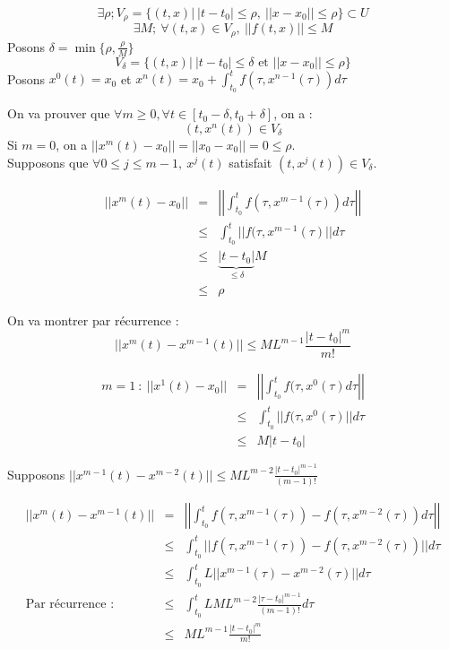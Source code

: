 \begin{dem}
\[\exists \rho; V_{\rho}=\{(t,x)|\ |t-t_0|\leq \rho,\ ||x-x_0||\leq \rho\}\subset U\]
\[\exists M;\ \forall(t,x)\in V_{\rho},\ ||f(t,x)||\leq M\]
Posons $\delta=\min\{\rho,\frac{\rho}{M}\}$
\[V_{\delta}=\{(t,x)|\ |t-t_0|\leq \delta \text{ et } ||x-x_0||\leq \rho\}\]
Posons $x^0(t)=x_0$ et $x^n(t)=x_0+\int_{t_0}^t f(\tau,x^{n-1}(\tau)) d\tau$ 

On va prouver que $\forall m\geq0, \forall t\in[t_0-\delta,t_0+\delta]$, on a : \[(t,x^n(t))\in V_{\delta}\]
Si $m=0$, on a $||x^m(t)-x_0||=||x_0-x_0||=0\leq \rho$.\\
Supposons que $\forall 0\leq j\leq m-1,\ x^j(t)$ satisfait $(t,x^j(t)) \in V_{\delta}$.

\begin{eqnarray*}
||x^m(t)-x_0||&=&\left|\left|\int_{t_0}^t f(\tau,x^{m-1}(\tau)) d\tau\right|\right|\\
&\leq& \int_{t_0}^t ||f(\tau,x^{m-1}(\tau)|| d\tau \\
&\leq& \underbrace{|t-t_0|}_{\leq \delta} M \\
&\leq& \rho
\end{eqnarray*}

On va montrer par récurrence :
\[||x^m(t)-x^{m-1}(t)|| \leq ML^{m-1} \frac{|t-t_0|^m}{m!}\]

\begin{eqnarray*}
m=1\ :\ ||x^1(t)-x_0||&=&\left|\left|\int_{t_0}^t f(\tau,x^0(\tau) d\tau \right|\right| \\
	&\leq& \int_{t_0}^t ||f(\tau,x^0(\tau)|| d\tau \\
	&\leq& M|t-t_0|
\end{eqnarray*}

Supposons $||x^{m-1}(t)-x^{m-2}(t)||\leq ML^{m-2}\frac{|t-t_0|^{m-1}}{(m-1)!}$

\begin{eqnarray*}
||x^m(t)-x^{m-1}(t)|| &=& \left|\left|\int_{t_0}^t f(\tau,x^{m-1}(\tau))-f(\tau,x^{m-2}(\tau)) d\tau \right|\right| \\
&\leq& \int_{t_0}^t ||f(\tau,x^{m-1}(\tau)) - f(\tau,x^{m-2}(\tau))|| d\tau \\
&\leq& \int_{t_0}^t L||x^{m-1}(\tau)-x^{m-2}(\tau)|| d\tau \\
\text{Par récurrence : } &\leq& \int_{t_0}^t LML^{m-2}\frac{|\tau-t_0|^{m-1}}{(m-1)!} d\tau \\
&\leq& M L^{m-1} \frac{|t-t_0|^m}{m!}
\end{eqnarray*}


\end{dem}
